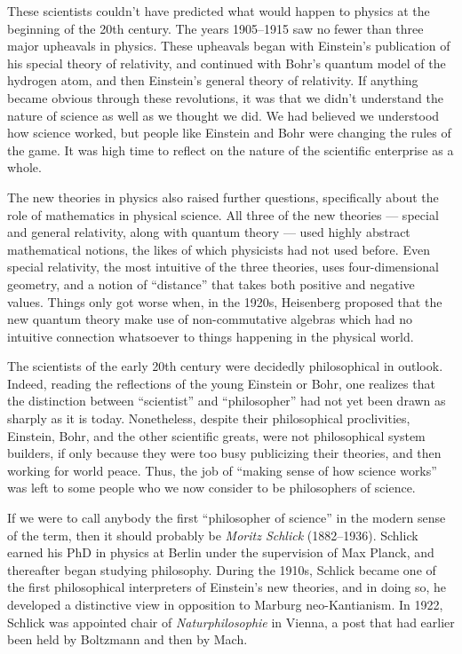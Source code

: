 These scientists couldn't have predicted what would happen to physics
at the beginning of the 20th century.  The years 1905--1915 saw no
fewer than three major upheavals in physics.  These upheavals began
with Einstein's publication of his special theory of relativity, and
continued with Bohr's quantum model of the hydrogen atom, and then
Einstein's general theory of relativity.  If anything became obvious
through these revolutions, it was that we didn't understand the nature
of science as well as we thought we did.  We had believed we
understood how science worked, but people like Einstein and Bohr were
changing the rules of the game.  It was high time to reflect on the
nature of the scientific enterprise as a whole.

The new theories in physics also raised further questions,
specifically about the role of mathematics in physical science.  All
three of the new theories --- special and general relativity, along
with quantum theory --- used highly abstract mathematical notions, the
likes of which physicists had not used before.  Even special
relativity, the most intuitive of the three theories, uses
four-dimensional geometry, and a notion of ``distance'' that takes
both positive and negative values.  Things only got worse when, in the
1920s, Heisenberg proposed that the new quantum theory make use of
non-commutative algebras which had no intuitive connection whatsoever
to things happening in the physical world.

The scientists of the early 20th century were decidedly philosophical
in outlook.  Indeed, reading the reflections of the young Einstein or
Bohr, one realizes that the distinction between ``scientist'' and
``philosopher'' had not yet been drawn as sharply as it is today.
Nonetheless, despite their philosophical proclivities, Einstein, Bohr,
and the other scientific greats, were not philosophical system
builders, if only because they were too busy publicizing their
theories, and then working for world peace.  Thus, the job of ``making
sense of how science works'' was left to some people who we now
consider to be philosophers of science.

If we were to call anybody the first ``philosopher of science'' in the
modern sense of the term, then it should probably be \emph{Moritz
  Schlick} (1882--1936).  Schlick earned his PhD in physics at Berlin
under the supervision of Max Planck, and thereafter began studying
philosophy.  During the 1910s, Schlick became one of the first
philosophical interpreters of Einstein's new theories, and in doing
so, he developed a distinctive view in opposition to Marburg
neo-Kantianism.  In 1922, Schlick was appointed chair of {\it
  Naturphilosophie} in Vienna, a post that had earlier been held by
Boltzmann and then by Mach.

